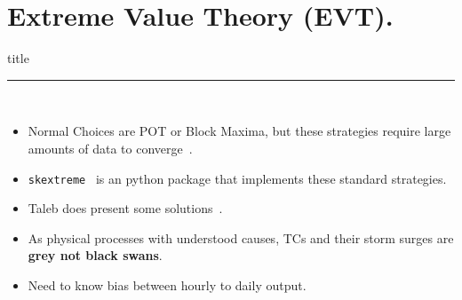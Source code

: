 \section{Extreme Value Theory (EVT). }
\begin{frame}[plain]
        \vfill
      \centering
      \begin{beamercolorbox}[sep=8pt,center,shadow=true,rounded=true]{title}
        \insertsectionhead\par%
        \color{oxfordblue}\noindent\rule{10cm}{1pt} \\
        \begin{itemize}
        \item Normal Choices are POT or Block Maxima, but these strategies require
              large amounts of data to converge~\cite{taleb2019much}.
        \item \texttt{skextreme}~\cite{skextremes} is an python package that implements these
              standard strategies.
        \item Taleb does present some solutions~\cite{taleb2019statistical}.
        \item As physical processes with understood causes, TCs
              and their storm surges are \textbf{grey not black
              swans}.
        \item Need to know bias between hourly to daily output.
        \end{itemize}
      \end{beamercolorbox}
      \vfills
\end{frame}


